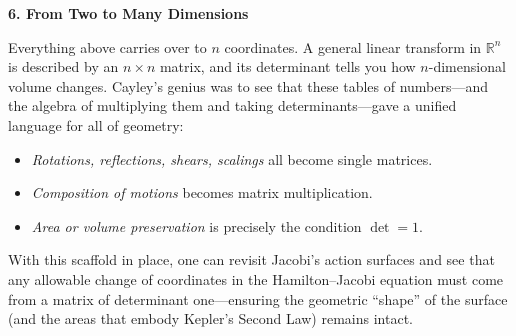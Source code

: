 







\bigskip
\noindent\textbf{6. From Two to Many Dimensions}

Everything above carries over to \(n\) coordinates.  A general linear transform in \(\mathbb{R}^n\) is described by an \(n\times n\) matrix, and its determinant tells you how \(n\)-dimensional volume changes.  Cayley’s genius was to see that these tables of numbers—and the algebra of multiplying them and taking determinants—gave a unified language for all of geometry:

\begin{itemize}
  \item \emph{Rotations, reflections, shears, scalings} all become single matrices.
  \item \emph{Composition of motions} becomes matrix multiplication.
  \item \emph{Area or volume preservation} is precisely the condition \(\det=1\).
\end{itemize}

With this scaffold in place, one can revisit Jacobi’s action surfaces and see that any allowable change of coordinates in the Hamilton–Jacobi equation must come from a matrix of determinant one—ensuring the geometric “shape” of the surface (and the areas that embody Kepler’s Second Law) remains intact.


